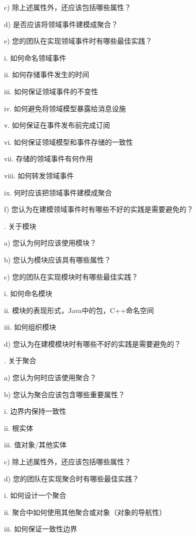 \documentclass[macfonts,master,oneside]{njuthesis}
\begin{document}
\noindent
c)	除上述属性外，还应该包括哪些属性？

\noindent
d)	是否应该将领域事件建模成聚合？

\noindent
e)	您的团队在实现领域事件时有哪些最佳实践？

\noindent
i.	如何命名领域事件

\noindent
ii.	如何存储事件发生的时间

\noindent
iii.	如何保证领域事件的不变性

\noindent
iv.	如何避免将领域模型暴露给消息设施

\noindent
v.	如何保证在事件发布前完成订阅

\noindent
vi.	如何保证领域模型和事件存储的一致性

\noindent
vii.	存储的领域事件有何作用

\noindent
viii.	如何转发领域事件

\noindent
ix.	何时应该把领域事件建模成聚合

\noindent
f)	您认为在建模领域事件时有哪些不好的实践是需要避免的？

.	关于模块

\noindent
a)	您认为何时应该使用模块？

\noindent
b)	您认为模块应该具有哪些属性？

\noindent
c)	您的团队在实现模块时有哪些最佳实践？

\noindent
i.	如何命名模块

\noindent
ii.	模块的表现形式，Java中的包，C++命名空间

\noindent
iii.	如何组织模块

\noindent
d)	您认为在建模模块时有哪些不好的实践是需要避免的？

.	关于聚合

\noindent
a)	您认为何时应该使用聚合？

\noindent
b)	您认为聚合应该包含哪些重要属性？

\noindent
i.	边界内保持一致性

\noindent
ii.	根实体

\noindent
iii.	值对象/其他实体

\noindent
c)	除上述属性外，还应该包括哪些属性？

\noindent
d)	您的团队在实现聚合时有哪些最佳实践？

\noindent
i.	如何设计一个聚合

\noindent
ii.	聚合中如何使用其他聚合或对象（对象的导航性）

\noindent
iii.	如何保证一致性边界
\end{document}

